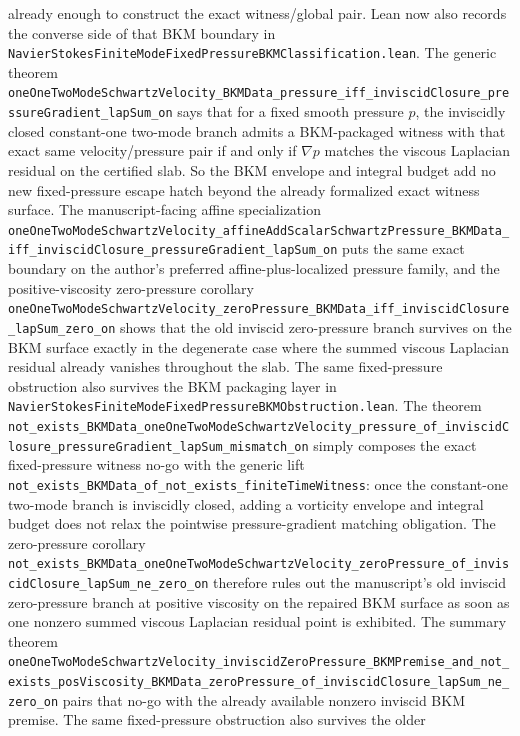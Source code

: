 \documentclass[11pt]{article}
\theoremstyle{remark}
\begin{document}
already enough to construct the exact witness/global pair.
Lean now also records the converse side of that BKM boundary in
\texttt{NavierStokesFiniteModeFixedPressureBKMClassification.lean}.  The
generic theorem
\texttt{oneOneTwoModeSchwartzVelocity\_BKMData\_pressure\_iff\_inviscidClosure\_pressureGradient\_lapSum\_on}
says that for a fixed smooth pressure \(p\), the inviscidly closed constant-one
two-mode branch admits a BKM-packaged witness with that exact same
velocity/pressure pair if and only if \(\nabla p\) matches the viscous
Laplacian residual on the certified slab.  So the BKM envelope and integral
budget add no new fixed-pressure escape hatch beyond the already formalized
exact witness surface.  The manuscript-facing affine specialization
\texttt{oneOneTwoModeSchwartzVelocity\_affineAddScalarSchwartzPressure\_BKMData\_iff\_inviscidClosure\_pressureGradient\_lapSum\_on}
puts the same exact boundary on the author's preferred affine-plus-localized
pressure family, and the positive-viscosity zero-pressure corollary
\texttt{oneOneTwoModeSchwartzVelocity\_zeroPressure\_BKMData\_iff\_inviscidClosure\_lapSum\_zero\_on}
shows that the old inviscid zero-pressure branch survives on the BKM surface
exactly in the degenerate case where the summed viscous Laplacian residual
already vanishes throughout the slab.
The same fixed-pressure obstruction also survives the BKM packaging layer in
\texttt{NavierStokesFiniteModeFixedPressureBKMObstruction.lean}.  The theorem
\texttt{not\_exists\_BKMData\_oneOneTwoModeSchwartzVelocity\_pressure\_of\_inviscidClosure\_pressureGradient\_lapSum\_mismatch\_on}
simply composes the exact fixed-pressure witness no-go with the generic lift
\texttt{not\_exists\_BKMData\_of\_not\_exists\_finiteTimeWitness}: once the
constant-one two-mode branch is inviscidly closed, adding a vorticity envelope
and integral budget does not relax the pointwise pressure-gradient matching
obligation.  The zero-pressure corollary
\texttt{not\_exists\_BKMData\_oneOneTwoModeSchwartzVelocity\_zeroPressure\_of\_inviscidClosure\_lapSum\_ne\_zero\_on}
therefore rules out the manuscript's old inviscid zero-pressure branch at
positive viscosity on the repaired BKM surface as soon as one nonzero summed
viscous Laplacian residual point is exhibited.  The summary theorem
\texttt{oneOneTwoModeSchwartzVelocity\_inviscidZeroPressure\_BKMPremise\_and\_not\_exists\_posViscosity\_BKMData\_zeroPressure\_of\_inviscidClosure\_lapSum\_ne\_zero\_on}
pairs that no-go with the already available nonzero inviscid BKM premise.
The same fixed-pressure obstruction also survives the older
\end{document}
